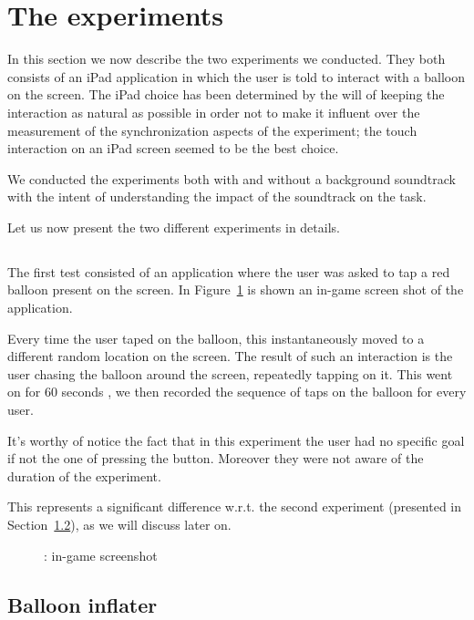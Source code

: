 \section{The experiments}
In this section we now describe the two experiments we conducted. They both consists of an iPad application in which the user is told to interact with a balloon on the screen. The iPad choice has been determined by the will of keeping the interaction as natural as possible in order not to make it influent over the measurement of the synchronization aspects of the experiment; the touch interaction on an iPad screen seemed to be the best choice.

We conducted the experiments both with and without a background soundtrack with the intent of understanding the impact of the soundtrack on the task.

Let us now present the two different experiments in details.

\subsection{\testfirst}
\label{sec:test1}
The first test consisted of an application where the user was asked to tap a red balloon present on the screen. In Figure~\ref{fig:test1} is shown an in-game screen shot of the application.

Every time the user taped on the balloon, this instantaneously moved to a different random location on the screen. The result of such an interaction is the user chasing the balloon around the screen, repeatedly tapping on it. This went on for 60 seconds , we then recorded the sequence of taps on the balloon for every user.

It's worthy of notice the fact that in this experiment the user had no specific goal if not the one of pressing the button. Moreover they were not aware of the duration of the experiment.

This represents a significant difference w.r.t. the second experiment (presented in Section~\ref{sec:test2}), as we will discuss later on.

\begin{figure}[h!t]
\label{fig:test1}
\centering
	{\setlength{\fboxsep}{0pt}
	 }
\caption{\testfirst: in-game screenshot}
\end{figure}

\subsection{Balloon inflater}
\label{sec:test2}
{\color{Gray}{\lipsum[7-10]}}